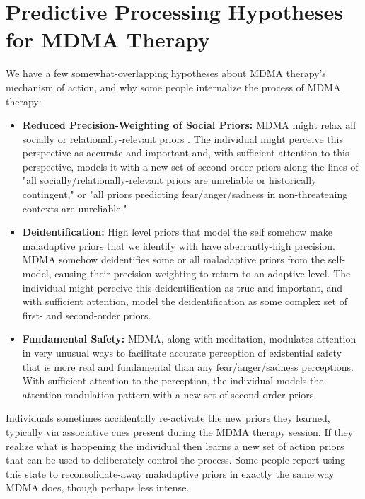 \documentclass[12pt,letterpaper]{book}
\begin{document}
\chapter{Predictive Processing Hypotheses for MDMA Therapy}
\label{ppHypotheses}
We have a few somewhat-overlapping hypotheses about MDMA therapy's mechanism of action, and why some people internalize the process of MDMA therapy:
\begin{itemize}
    \item \textbf{Reduced Precision-Weighting of Social Priors:} MDMA might relax all socially or relationally-relevant priors \cite{carhart2019rebus}. The individual might perceive this perspective as accurate and important and, with sufficient attention to this perspective, models it with a new set of second-order priors along the lines of "all socially/relationally-relevant priors are unreliable or historically contingent," or "all priors predicting fear/anger/sadness in non-threatening contexts are unreliable."
    \item \textbf{Deidentification:} High level priors that model the self somehow make maladaptive priors that we identify with have aberrantly-high precision. MDMA somehow deidentifies some or all maladaptive priors from the self-model, causing their precision-weighting to return to an adaptive level. The individual might perceive this deidentification as true and important, and with sufficient attention, model the deidentification as some complex set of first- and second-order priors.
    \item \textbf{Fundamental Safety:} MDMA, along with meditation, modulates attention in very unusual ways to facilitate accurate perception of existential safety that is more real and fundamental than any fear/anger/sadness perceptions. With sufficient attention to the perception, the individual models the attention-modulation pattern with a new set of second-order priors.
\end{itemize}
Individuals sometimes accidentally re-activate the new priors they learned, typically via associative cues present during the MDMA therapy session. If they realize what is happening the individual then learns a new set of action priors that can be used to deliberately control the process. Some people report using this state to reconsolidate-away maladaptive priors in exactly the same way MDMA does, though perhaps less intense.
\end{document}
